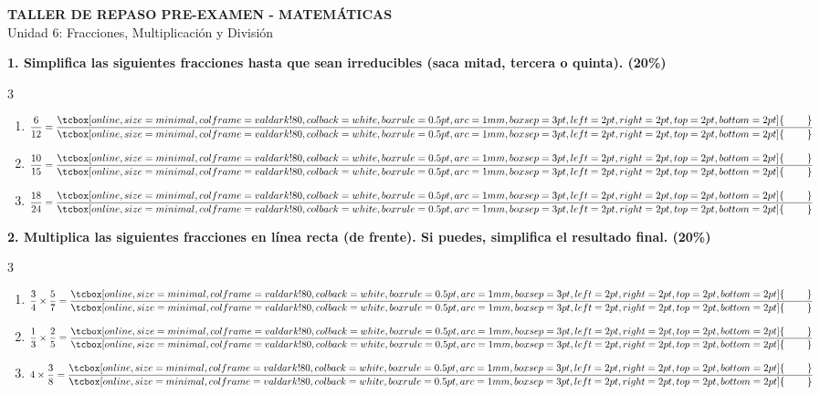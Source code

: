 \documentclass[12pt, letterpaper]{article}
\newcommand{\boxfill}[1][1.5cm]{\tcbox[on line, size=minimal, colframe=valdark!80, colback=white, boxrule=0.5pt, arc=1mm, boxsep=3pt, left=2pt, right=2pt, top=2pt, bottom=2pt]{\hspace*{#1}\vphantom{M}}}
\begin{document}
	
	\begin{center}
		\textbf{TALLER DE REPASO PRE-EXAMEN - MATEMÁTICAS}\\[0.1cm]
		Unidad 6: Fracciones, Multiplicación y División
	\end{center}
	
	\vspace{0.3cm}
	
	
	
	\noindent \textbf{1. Simplifica las siguientes fracciones hasta que sean irreducibles (saca mitad, tercera o quinta). (20\%)}
	
	\vspace{0.4cm}
	\begin{multicols}{3}
		\begin{enumerate}[label=\textbf{\Alph*)}, itemsep=0.8cm]
			\item $\dfrac{6}{12} = \dfrac{\boxfill[0.8cm]}{\boxfill[0.8cm]}$
			
			\item $\dfrac{10}{15} = \dfrac{\boxfill[0.8cm]}{\boxfill[0.8cm]}$
			
			\item $\dfrac{18}{24} = \dfrac{\boxfill[0.8cm]}{\boxfill[0.8cm]}$
		\end{enumerate}
	\end{multicols}
	
	\vspace{0.8cm}
	
	\noindent \textbf{2. Multiplica las siguientes fracciones en línea recta (de frente). Si puedes, simplifica el resultado final. (20\%)}
	
	\vspace{0.5cm}
	\begin{multicols}{3}
		\begin{enumerate}[label=\textbf{\Alph*)}, itemsep=1.5cm]
			\item $\dfrac{3}{4} \times \dfrac{5}{7} = \dfrac{\boxfill[0.8cm]}{\boxfill[0.8cm]}$
			
			\item $\dfrac{1}{3} \times \dfrac{2}{5} = \dfrac{\boxfill[0.8cm]}{\boxfill[0.8cm]}$
			
			\item $4 \times \dfrac{3}{8} = \dfrac{\boxfill[0.8cm]}{\boxfill[0.8cm]}$
		\end{enumerate}
	\end{multicols}
	
	\vspace{0.8cm}
	
\end{document}
